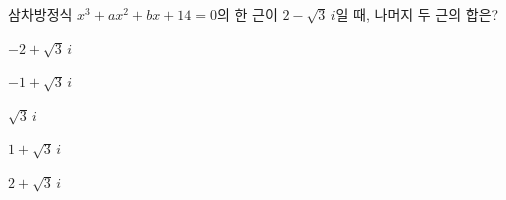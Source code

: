 삼차방정식 $x^3+ax^2+bx+14=0$의 한 근이 $2-\sqrt{3}\,i$일 때, 나머지 두 근의 합은? 
\begin{choices32}{\rule[-3ex]{0pt}{8ex}$-2+\sqrt{3}\,i$}{\rule[-3ex]{0pt}{8ex}$-1+\sqrt{3}\,i$}{\rule[-3ex]{0pt}{8ex}$\sqrt{3}\,i$}{\rule[-3ex]{0pt}{8ex}$1+\sqrt{3}\,i$}{\rule[-3ex]{0pt}{8ex}$2+\sqrt{3}\,i$}\end{choices32}
